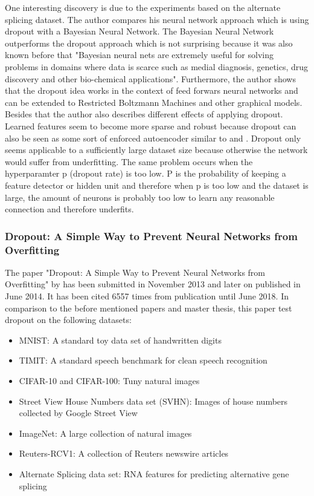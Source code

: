 \documentclass[a4paper]{article}
\begin{document}
One interesting discovery is due to the experiments based on the alternate splicing dataset. The author compares his neural network approach which is using dropout with a Bayesian Neural Network. The Bayesian Neural Network outperforms the dropout approach which is not surprising because it was also known before that "Bayesian neural nets are extremely useful for solving problems in domains where data is scarce such as medial diagnosis, genetics, drug discovery and other bio-chemical applications". Furthermore, the author shows that the dropout idea works in the context of feed forwars neural networks and can be extended to Restricted Boltzmann Machines and other graphical models. Besides that the author also describes different effects of applying dropout. Learned features seem to become more sparse and robust because dropout can also be seen as some sort of enforced autoencoder similar to \cite{vincent2008extracting} and \cite{vincent2010stacked}. Dropout only seems applicable to a sufficiently large dataset size because otherwise the network would suffer from underfitting. The same problem occurs when the hyperparamter p (dropout rate) is too low. P is the probability of keeping a feature detector or hidden unit and therefore when p is too low and the dataset is large, the amount of neurons is probably too low to learn any reasonable connection and therefore underfits.


\subsubsection{Dropout: A Simple Way to Prevent Neural Networks from Overfitting}

The paper "Dropout: A Simple Way to Prevent Neural Networks from Overfitting" by \cite{Srivastava:2014:DSW:2627435.2670313} has been submitted in November 2013 and later on published in June 2014. It has been cited 6557 times from publication until June 2018. In comparison to the before mentioned papers and master thesis, this paper test dropout on the following datasets:


\begin{itemize}
	\item MNIST: A standard toy data set of handwritten digits
	\item TIMIT: A standard speech benchmark for clean speech recognition
	\item CIFAR-10 and CIFAR-100: Tuny natural images
	\item Street View House Numbers data set (SVHN): Images of house numbers collected by Google Street View
	\item ImageNet: A large collection of natural images
	\item Reuters-RCV1: A collection of Reuters newswire articles
	\item Alternate Splicing data set: RNA features for predicting alternative gene splicing
\end{itemize}
\end{document}
